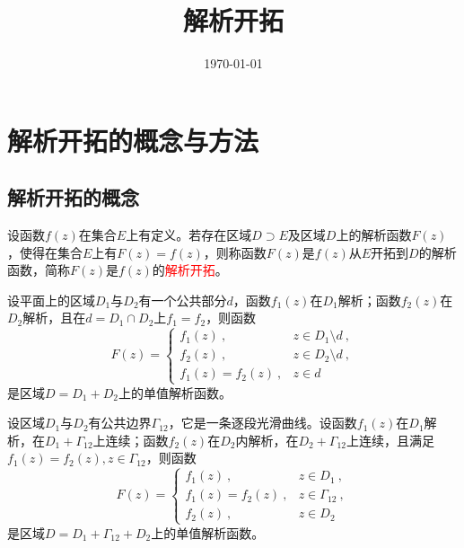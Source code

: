\documentclass[12pt,a4paper]{article}
\title{解析开拓}
\author{}
\date{\today}
\begin{document}
\maketitle
\section{解析开拓的概念与方法}
\subsection{解析开拓的概念}
\begin{tcolorbox}[colback=green!5,colframe=green!40!black,title= 定义]
设函数$f(z)$在集合$E$上有定义。若存在区域$D \supset E$及区域$D$上的解析函数$F(z)$，使得在集合$E$上有$F(z) = f(z)$，则称函数$F(z)$是$f(z)$从$E$开拓到$D$的解析函数，简称$F(z)$是$f(z)$的\textcolor{red}{解析开拓}。
\end{tcolorbox}



\begin{tcolorbox}[colback=green!5,colframe=green!40!black,title= Theorem]
设平面上的区域$D_1$与$D_2$有一个公共部分$d$，函数$f_1(z)$在$D_1$解析；函数$f_2(z)$在$D_2$解析，且在$d = D_1\cap D_2$上$f_1 = f_2$，则函数
\begin{equation}
F(z) = \begin{cases}
f_1(z) ~, & z \in D_1\setminus d ~, \\
f_2(z) ~, & z \in D_2\setminus d ~, \\ 
f_1(z) = f_2(z) ~, &z \in d
\end{cases}
\end{equation}
是区域$D = D_1 +D_2$上的单值解析函数。
\end{tcolorbox}


\begin{tcolorbox}[colback=green!5,colframe=green!40!black,title= Theorem]
设区域$D_1$与$D_2$有公共边界$\Gamma_{12}$，它是一条逐段光滑曲线。设函数$f_1(z)$在$D_1$解析，在$D_1+\Gamma_{12}$上连续；函数$f_2(z)$在$D_2$内解析，在$D_2 +\Gamma_{12}$上连续，且满足$f_1(z) = f_2(z), z \in \Gamma_{12}$，则函数
\begin{equation}
F(z) = \begin{cases}
f_1(z) ~, & z \in D_1 ~, \\
f_1(z) = f_2(z) ~, & z \in \Gamma_{12} ~, \\ 
f_2(z) ~, &z \in D_2
\end{cases}
\end{equation}
是区域$D = D_1 +\Gamma_{12} +D_2$上的单值解析函数。
\end{tcolorbox}
\end{document}
